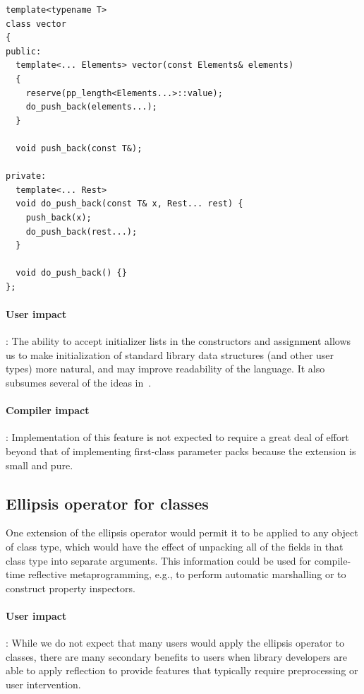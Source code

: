 \documentclass{article}
\begin{document}
\begin{verbatim}
template<typename T>
class vector
{
public:
  template<... Elements> vector(const Elements& elements)
  {
    reserve(pp_length<Elements...>::value);
    do_push_back(elements...);
  }

  void push_back(const T&);

private:
  template<... Rest>
  void do_push_back(const T& x, Rest... rest) {
    push_back(x);
    do_push_back(rest...);
  }

  void do_push_back() {}
};
\end{verbatim}

\paragraph{User impact}: The ability to accept initializer lists in
the constructors and assignment allows us to make initialization of
standard library data structures (and other user types) more natural,
and may improve readability of the language. It also subsumes several
of the ideas in~\cite{DoReStr03}.

\paragraph{Compiler impact}: Implementation of this feature is not
expected to require a great deal of effort beyond that of implementing
first-class parameter packs because the extension is small and pure.

\subsection{Ellipsis operator for classes}
One extension of the ellipsis operator would permit it to be applied
to any object of class type, which would have the effect of unpacking
all of the fields in that class type into separate arguments. This
information could be used for compile-time reflective metaprogramming,
e.g., to perform automatic marshalling or to construct property
inspectors. 

\paragraph{User impact}: While we do not expect that many users would
apply the ellipsis operator to classes, there are many secondary
benefits to users when library developers are able to apply reflection
to provide features that typically require preprocessing or user
intervention. 
\end{document}

